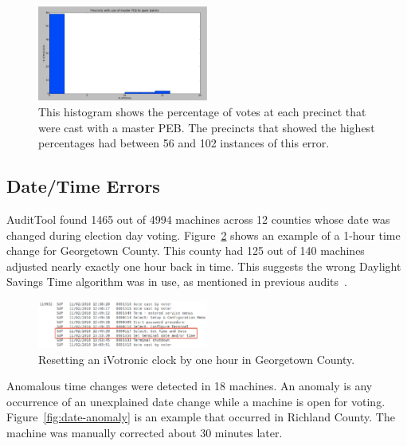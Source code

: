 \documentclass[letterpaper,twocolumn,10pt]{article}
\begin{document}
\begin{figure}[htbp]
\begin{center}
    \includegraphics[width=0.5\textwidth,height=0.4\textheight]{PEBactivateHist.eps}
\end{center}
\caption{This histogram shows the percentage of votes at each precinct that were 
cast with a master PEB.  The precincts that showed the highest percentages had 
between 56 and 102 instances of this error.}
\label{fig:master-peb-activated}
\end{figure}

\subsection{Date/Time Errors}
 AuditTool found 1465 out of 4994 machines across 12 counties whose date was
 changed during election day voting. Figure~\ref{fig:one-hour-reset} shows an
 example of a 1-hour time change for Georgetown County. This county had 125 out
 of 140 machines adjusted nearly exactly one hour back in time. This suggests
 the wrong Daylight Savings Time algorithm was in use, as mentioned in previous
 audits~\cite{Buell2011}.

\begin{figure}[htbp]
\begin{center}
    \includegraphics[width=0.5\textwidth,height=0.1\textheight]{ResetClock.eps}
\end{center}
\caption{Resetting an iVotronic clock by one hour in Georgetown County.}
\label{fig:one-hour-reset}
\end{figure}

Anomalous time changes were detected in 18 machines. An anomaly is any
occurrence of an unexplained date change while a machine is open for
voting. Figure~\ref{fig:date-anomaly} is an example that occurred in Richland
County. The machine was manually corrected about 30 minutes later.  
\end{document}
